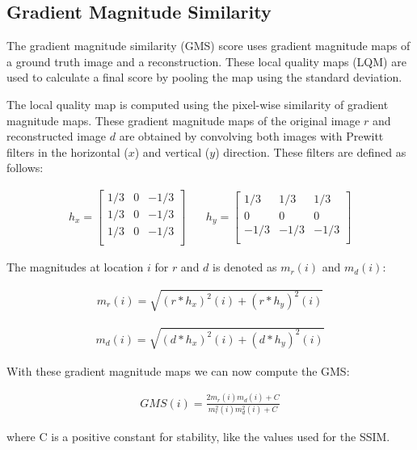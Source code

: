 
\subsection{Gradient Magnitude Similarity}

The gradient magnitude similarity (GMS) score uses gradient magnitude maps of a ground truth image and a reconstruction. These local quality maps (LQM) are used to calculate a final score by pooling the map using the standard deviation.

The local quality map is computed using the pixel-wise similarity of gradient magnitude maps. These gradient magnitude maps of the original image $r$ and reconstructed image $d$ are obtained by convolving both images with Prewitt filters in the horizontal ($x$) and vertical ($y$) direction. These filters are defined as follows:

\begin{align}
    h_x =
  \left[ {\begin{array}{ccc}
    1/3 & 0 & -1/3\\
    1/3 & 0 & -1/3\\
    1/3 & 0 & -1/3\\
  \end{array} } \right]
  & \, &
    h_y =
  \left[ {\begin{array}{ccc}
    1/3 & 1/3 & 1/3\\
    0 & 0 & 0\\
    -1/3 & -1/3 & -1/3\\
  \end{array} } \right]
\end{align}

The magnitudes at location $i$ for $r$ and $d$ is denoted as $m_r(i)$ and $m_d(i)$:

\begin{align}
    m_r(i) = \sqrt{ (r \ast h_x)^2 (i) + (r \ast h_y)^2 (i) }
\end{align}

\begin{align}
    m_d(i) = \sqrt{ (d \ast h_x)^2 (i) + (d \ast h_y)^2 (i) }
\end{align}

With these gradient magnitude maps we can now compute the GMS:

\begin{align}
    GMS(i) = \frac{2m_r (i) m_d (i) + C}{m^2_r(i) m^2_d(i) + C}
    \label{eq:prelim:gms}
\end{align}

where C is a positive constant for stability, like the values used for the SSIM.